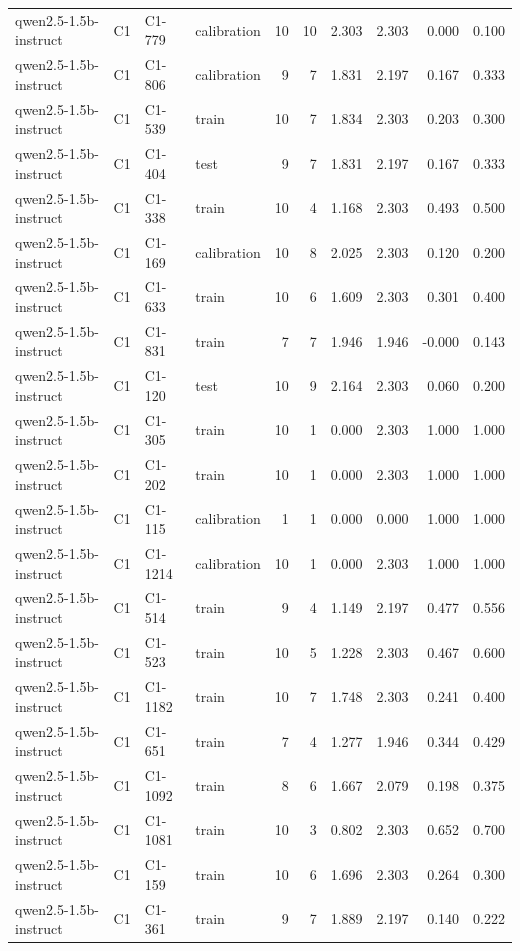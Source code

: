 \begin{table}
\begin{tabular}{llllrrrrrr}
qwen2.5-1.5b-instruct & C1 & C1-779 & calibration & 10 & 10 & 2.303 & 2.303 & 0.000 & 0.100 \\
qwen2.5-1.5b-instruct & C1 & C1-806 & calibration & 9 & 7 & 1.831 & 2.197 & 0.167 & 0.333 \\
qwen2.5-1.5b-instruct & C1 & C1-539 & train & 10 & 7 & 1.834 & 2.303 & 0.203 & 0.300 \\
qwen2.5-1.5b-instruct & C1 & C1-404 & test & 9 & 7 & 1.831 & 2.197 & 0.167 & 0.333 \\
qwen2.5-1.5b-instruct & C1 & C1-338 & train & 10 & 4 & 1.168 & 2.303 & 0.493 & 0.500 \\
qwen2.5-1.5b-instruct & C1 & C1-169 & calibration & 10 & 8 & 2.025 & 2.303 & 0.120 & 0.200 \\
qwen2.5-1.5b-instruct & C1 & C1-633 & train & 10 & 6 & 1.609 & 2.303 & 0.301 & 0.400 \\
qwen2.5-1.5b-instruct & C1 & C1-831 & train & 7 & 7 & 1.946 & 1.946 & -0.000 & 0.143 \\
qwen2.5-1.5b-instruct & C1 & C1-120 & test & 10 & 9 & 2.164 & 2.303 & 0.060 & 0.200 \\
qwen2.5-1.5b-instruct & C1 & C1-305 & train & 10 & 1 & 0.000 & 2.303 & 1.000 & 1.000 \\
qwen2.5-1.5b-instruct & C1 & C1-202 & train & 10 & 1 & 0.000 & 2.303 & 1.000 & 1.000 \\
qwen2.5-1.5b-instruct & C1 & C1-115 & calibration & 1 & 1 & 0.000 & 0.000 & 1.000 & 1.000 \\
qwen2.5-1.5b-instruct & C1 & C1-1214 & calibration & 10 & 1 & 0.000 & 2.303 & 1.000 & 1.000 \\
qwen2.5-1.5b-instruct & C1 & C1-514 & train & 9 & 4 & 1.149 & 2.197 & 0.477 & 0.556 \\
qwen2.5-1.5b-instruct & C1 & C1-523 & train & 10 & 5 & 1.228 & 2.303 & 0.467 & 0.600 \\
qwen2.5-1.5b-instruct & C1 & C1-1182 & train & 10 & 7 & 1.748 & 2.303 & 0.241 & 0.400 \\
qwen2.5-1.5b-instruct & C1 & C1-651 & train & 7 & 4 & 1.277 & 1.946 & 0.344 & 0.429 \\
qwen2.5-1.5b-instruct & C1 & C1-1092 & train & 8 & 6 & 1.667 & 2.079 & 0.198 & 0.375 \\
qwen2.5-1.5b-instruct & C1 & C1-1081 & train & 10 & 3 & 0.802 & 2.303 & 0.652 & 0.700 \\
qwen2.5-1.5b-instruct & C1 & C1-159 & train & 10 & 6 & 1.696 & 2.303 & 0.264 & 0.300 \\
qwen2.5-1.5b-instruct & C1 & C1-361 & train & 9 & 7 & 1.889 & 2.197 & 0.140 & 0.222 \\

\end{tabular}
\end{table}

